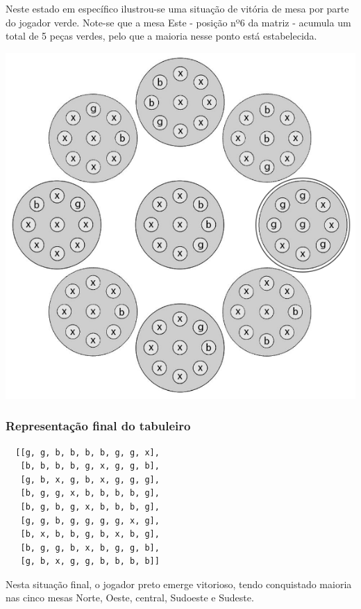 \documentclass[a4paper]{article}
\begin{document}
Neste estado em específico ilustrou-se uma situação de vitória de mesa por parte do jogador verde. Note-se que a mesa Este - posição nº6 da matriz - acumula um total de 5 peças verdes, pelo que a maioria nesse ponto está estabelecida.

\includegraphics[scale=0.5]{board-setup-2.png}

\subsubsection{Representação final do tabuleiro}

\begin{lstlisting}
  [[g, g, b, b, b, b, g, g, x],
   [b, b, b, b, g, x, g, g, b],
   [g, b, x, g, b, x, g, g, g],
   [b, g, g, x, b, b, b, b, g],
   [b, g, b, g, x, b, b, b, g],
   [g, g, b, g, g, g, g, x, g],
   [b, x, b, b, g, b, x, b, g],
   [b, g, g, b, x, b, g, g, b],
   [g, b, x, g, g, b, b, b, b]]
\end{lstlisting}

Nesta situação final, o jogador preto emerge vitorioso, tendo conquistado maioria nas cinco mesas Norte, Oeste, central, Sudoeste e Sudeste. \newline
\end{document}
